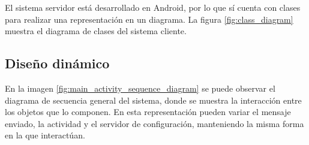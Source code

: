 \documentclass[12pt, twoside]{article}
\begin{document}
        El sistema servidor está desarrollado en Android, por lo que sí cuenta con clases para realizar una representación en un diagrama. La figura \ref{fig:class_diagram} muestra el diagrama de clases del sistema cliente.
        
    \pagebreak

    \subsection{Diseño dinámico}
    
    En la imagen \ref{fig:main_activity_sequence_diagram} se puede observar el diagrama de secuencia general del sistema, donde se muestra la interacción entre los objetos que lo componen. En esta representación pueden variar el mensaje enviado, la actividad y el servidor de configuración, manteniendo la misma forma en la que interactúan.
\end{document}
